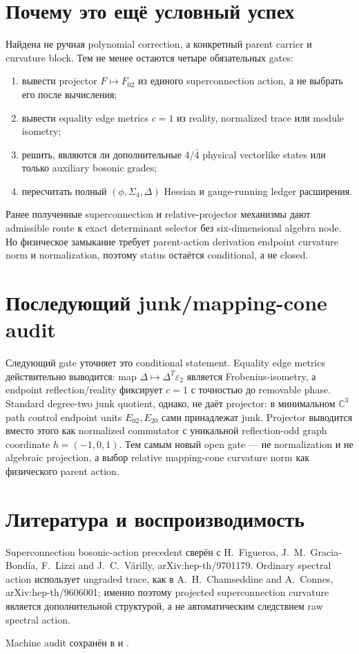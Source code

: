 \section{Почему это ещё условный успех}

Найдена не ручная polynomial correction, а конкретный parent carrier и
curvature block. Тем не менее остаются четыре обязательных gates:
\begin{enumerate}
 \item вывести projector \(F\mapsto F_{02}\) из единого superconnection
 action, а не выбрать его после вычисления;
 \item вывести equality edge metrics \(c=1\) из reality, normalized trace или
 module isometry;
 \item решить, являются ли дополнительные \(4/\bar4\) physical vectorlike
 states или только auxiliary bosonic grades;
 \item пересчитать полный \((\phi,\Sigma_4,\Delta)\) Hessian и gauge-running
 ledger расширения.
\end{enumerate}

\begin{theorem}
Ранее полученные superconnection и relative-projector механизмы дают
admissible route к exact determinant selector без
six-dimensional algebra node. Но физическое замыкание требует parent-action
derivation endpoint curvature norm и normalization, поэтому status остаётся
conditional, а не closed.
\end{theorem}

\section{Последующий junk/mapping-cone audit}

Следующий gate уточняет это conditional statement. Equality edge metrics
действительно выводится: map
\(\Delta\mapsto\Delta^T\varepsilon_2\) является Frobenius-isometry, а
endpoint reflection/reality фиксирует \(c=1\) с точностью до removable
phase. Standard degree-two junk quotient, однако, не даёт projector: в
минимальном \(\mathbb C^3\) path control endpoint units \(E_{02},E_{20}\)
сами принадлежат junk. Projector выводится вместо этого как normalized
commutator с уникальной reflection-odd graph coordinate
\(h=(-1,0,1)\). Тем самым новый open gate --- не normalization и не algebraic
projection, а выбор relative mapping-cone curvature norm как физического
parent action.

\section{Литература и воспроизводимость}

Superconnection bosonic-action precedent сверён с
H.~Figueroa, J.~M.~Gracia-Bond\'ia, F.~Lizzi and J.~C.~V\'arilly,
arXiv:hep-th/9701179. Ordinary spectral action использует ungraded trace,
как в A.~H.~Chamseddine and A.~Connes, arXiv:hep-th/9606001; именно поэтому
projected superconnection curvature является дополнительной структурой, а
не автоматическим следствием raw spectral action.

Machine audit сохранён в
 и
.